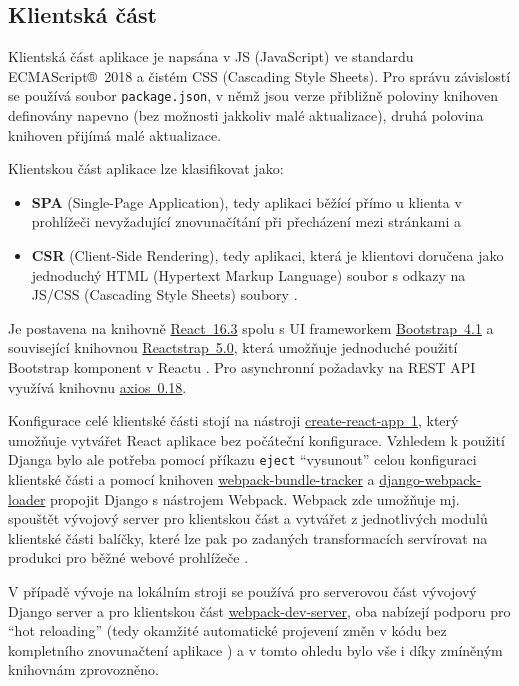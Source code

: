 \subsection{Klientská část}

Klientská část aplikace \cite{bp} je napsána v JS (JavaScript) ve standardu ECMAScript®~2018 a čistém CSS (Cascading Style Sheets). Pro správu závislostí se používá soubor \verb|package.json|, v němž jsou verze přibližně poloviny knihoven definovány napevno (bez možnosti jakkoliv malé aktualizace), druhá polovina knihoven přijímá malé aktualizace. 

Klientskou část aplikace lze klasifikovat jako: 
\begin{itemize}
    \item \textbf{SPA} (Single-Page Application), tedy aplikaci běžící přímo u klienta v prohlížeči nevyžadující znovunačítání při přecházení mezi stránkami \cite{spa1} a
    \item \textbf{CSR} (Client-Side Rendering), tedy aplikaci, která je klientovi doručena jako jednoduchý HTML (Hypertext Markup Language) soubor s odkazy na JS/CSS (Cascading Style Sheets) soubory \cite{csr-ssr}.
\end{itemize}

Je postavena na knihovně \href{https://reactjs.org/}{React~16.3} spolu s UI frameworkem \href{https://getbootstrap.com}{Bootstrap~4.1} a související knihovnou \href{https://reactstrap.github.io/}{Reactstrap~5.0}, která umožňuje jednoduché použití Bootstrap komponent v Reactu \cite{reactstrap}. Pro asynchronní požadavky na REST API využívá knihovnu \href{https://github.com/axios/axios}{axios~0.18}. 

Konfigurace celé klientské části stojí na nástroji \href{https://github.com/facebook/create-react-app}{create-react-app~1}, který umožňuje \cite{cra} vytvářet React aplikace bez počáteční konfigurace. Vzhledem k použití Djanga bylo ale potřeba \cite{bp} pomocí příkazu \verb|eject| \enquote{vysunout} celou konfiguraci klientské části a pomocí knihoven \href{https://github.com/owais/webpack-bundle-tracker}{webpack-bundle-tracker} a  \href{https://github.com/owais/django-webpack-loader}{django-webpack-loader} propojit Django s nástrojem Webpack. Webpack zde umožňuje mj. spouštět vývojový server pro klientskou část a vytvářet z jednotlivých modulů klientské části balíčky, které lze pak po zadaných transformacích servírovat na produkci pro běžné webové prohlížeče \cite{webpack-ackee}.

V případě vývoje na lokálním stroji se používá \cite{bp} pro serverovou část vývojový Django server a pro klientskou část \href{https://github.com/webpack/webpack-dev-server}{webpack-dev-server}, oba nabízejí podporu pro \enquote{hot reloading} (tedy okamžité automatické projevení změn v kódu bez kompletního znovunačtení aplikace \cite{webpack-docs-hmr}) a v tomto ohledu bylo vše i díky zmíněným knihovnám zprovozněno.

